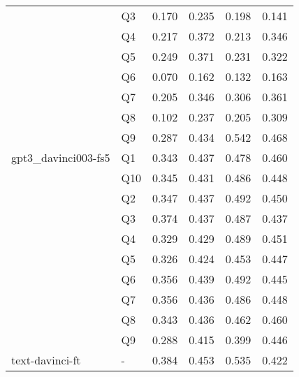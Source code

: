 \begin{tabular}{llrrrr}
                & Q3 & 0.170 & 0.235 & 0.198 & 0.141 \\
                & Q4 & 0.217 & 0.372 & 0.213 & 0.346 \\
                & Q5 & 0.249 & 0.371 & 0.231 & 0.322 \\
                & Q6 & 0.070 & 0.162 & 0.132 & 0.163 \\
                & Q7 & 0.205 & 0.346 & 0.306 & 0.361 \\
                & Q8 & 0.102 & 0.237 & 0.205 & 0.309 \\
                & Q9 & 0.287 & 0.434 & 0.542 & 0.468 \\
gpt3\_davinci003-fs5 & Q1 & 0.343 & 0.437 & 0.478 & 0.460 \\
                & Q10 & 0.345 & 0.431 & 0.486 & 0.448 \\
                & Q2 & 0.347 & 0.437 & 0.492 & 0.450 \\
                & Q3 & 0.374 & 0.437 & 0.487 & 0.437 \\
                & Q4 & 0.329 & 0.429 & 0.489 & 0.451 \\
                & Q5 & 0.326 & 0.424 & 0.453 & 0.447 \\
                & Q6 & 0.356 & 0.439 & 0.492 & 0.445 \\
                & Q7 & 0.356 & 0.436 & 0.486 & 0.448 \\
                & Q8 & 0.343 & 0.436 & 0.462 & 0.460 \\
                & Q9 & 0.288 & 0.415 & 0.399 & 0.446 \\
text-davinci-ft & - & 0.384 & 0.453 & 0.535 & 0.422 \\
\bottomrule
\end{tabular}
